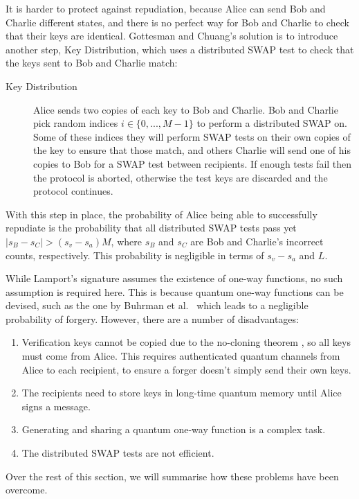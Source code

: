 \documentclass[%
 reprint,
 amsmath,amssymb,
 aps,
 pra,
]{revtex4-1}
\begin{document}
It is harder to protect against repudiation, because Alice can send Bob and Charlie different states, and there is no perfect way for Bob and Charlie to check that their keys are identical. Gottesman and Chuang's solution is to introduce another step, Key Distribution, which uses a distributed SWAP test to check that the keys sent to Bob and Charlie match:

\begin{description}
\item[Key Distribution]Alice sends two copies of each key to Bob and Charlie. Bob and Charlie pick random indices $i \in \{0,...,M-1\}$ to perform a distributed SWAP on. Some of these indices they will perform SWAP tests on their own copies of the key to ensure that those match, and others Charlie will send one of his copies to Bob for a SWAP test between recipients. If enough tests fail then the protocol is aborted, otherwise the test keys are discarded and the protocol continues.
\end{description}

With this step in place, the probability of Alice being able to successfully repudiate is the probability that all distributed SWAP tests pass yet $|s_B - s_C| > (s_v - s_a)M$, where $s_B$ and $s_C$ are Bob and Charlie's incorrect counts, respectively. This probability is negligible in terms of $s_v - s_a$ and $L$.

While Lamport's signature assumes the existence of one-way functions, no such assumption is required here. This is because quantum one-way functions can be devised, such as the one by Buhrman et al.~\cite{PhysRevLett.87.167902} which leads to a negligible probability of forgery. However, there are a number of disadvantages:

\begin{enumerate}
\item Verification keys cannot be copied due to the no-cloning theorem \cite{WZ82}, so all keys must come from Alice. This requires authenticated quantum channels from Alice to each recipient, to ensure a forger doesn't simply send their own keys.
\item The recipients need to store keys in long-time quantum memory until Alice signs a message.
\item Generating and sharing a quantum one-way function is a complex task.
\item The distributed SWAP tests are not efficient.
\end{enumerate}

Over the rest of this section, we will summarise how these problems have been overcome.
\end{document}
